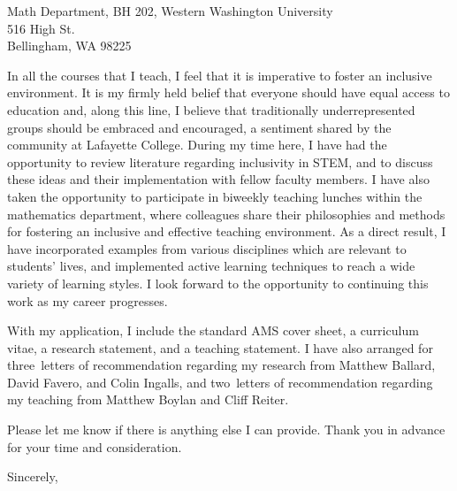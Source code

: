 \documentclass[12pt]{letter}
\def\diversityblurb{In all the courses that I teach, I feel that it is imperative to foster an inclusive environment.
  It is my firmly held belief that everyone should have equal access to education and, along this line, I believe that traditionally underrepresented groups should be embraced and encouraged, a sentiment shared by the community at Lafayette College.
  During my time here, I have had the opportunity to review literature regarding inclusivity in STEM, and to discuss these ideas and their implementation with fellow faculty members.
  I have also taken the opportunity to participate in biweekly teaching lunches within the mathematics department, where colleagues share their philosophies and methods for fostering an inclusive and effective teaching environment.
  As a direct result, I have incorporated examples from various disciplines which are relevant to students' lives, and implemented active learning techniques to reach a wide variety of learning styles.
  I look forward to the opportunity to continuing this work as my career progresses.}
\def\materials{the standard AMS cover sheet,
  a curriculum vitae,
  a research statement,
  and a teaching statement}
\def\numresrefs{three}
\def\numteachrefs{two}
\def\refs{Matthew Ballard,
  David Favero,
  and Colin Ingalls}
\def\teachingrefs{Matthew Boylan and Cliff Reiter}
\begin{document}
\begin{letter}{
    Math Department, BH 202, Western Washington University\\
    516 High St.\\
    Bellingham, WA 98225
  }

  
  
  


\diversityblurb
  
  With my application, I include \materials.
  I have also arranged for \numresrefs\  letters of recommendation regarding my research from \refs, and \numteachrefs\ letters of recommendation regarding my teaching from \teachingrefs.

  
  Please let me know if there is anything else I can provide.
  Thank you in advance for your time and consideration.
  \closing{Sincerely,}
\end{letter}
\end{document}

